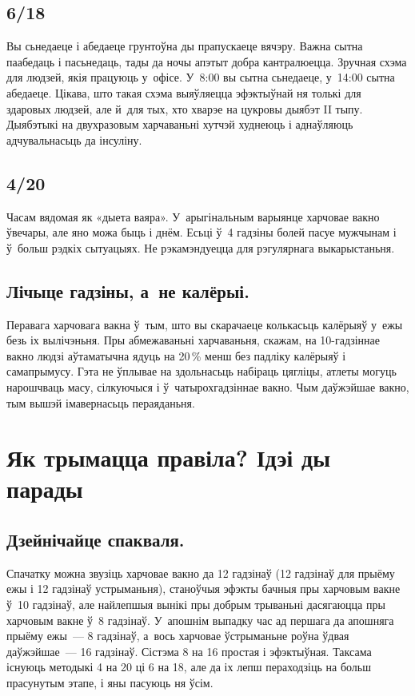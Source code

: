 
\subsection{6/18}
Вы сьнедаеце і абедаеце грунтоўна ды прапускаеце вячэру. Важна сытна паабедаць і пасьнедаць, тады да ночы апэтыт добра кантралюецца. Зручная схэма для людзей, якія працуюць у~офісе. У~8:00 вы сытна сьнедаеце, у~14:00 сытна абедаеце. Цікава, што такая схэма выяўляецца эфэктыўнай ня толькі для здаровых людзей, але й~для тых, хто хварэе на цукровы дыябэт II тыпу. Дыябэтыкі на двухразовым харчаваньні хутчэй худнеюць і аднаўляюць адчувальнасьць да інсуліну.

\subsection{4/20}
Часам вядомая як «дыета ваяра». У~арыгінальным варыянце харчовае вакно ўвечары, але яно можа быць і днём. Есьці ў~4 гадзіны болей пасуе мужчынам і ў~больш рэдкіх сытуацыях. Не рэкамэндуецца для рэгулярнага выкарыстаньня.

\subsection{Лічыце гадзіны, а~не калёрыі.}
Перавага харчовага вакна ў~тым, што вы скарачаеце колькасьць калёрыяў у~ежы безь іх вылічэньня. Пры абмежаваньні харчаваньня, скажам, на 10-гадзіннае вакно людзі аўтаматычна ядуць на 20\,\% менш без падліку калёрыяў і самапрымусу. Гэта не ўплывае на здольнасьць набіраць цягліцы, атлеты могуць нарошчваць масу, сілкуючыся і ў~чатырохгадзіннае вакно. Чым даўжэйшае вакно, тым вышэй імавернасьць пераяданьня.

\section{Як трымацца правіла? Ідэі ды парады}

\subsection{Дзейнічайце спакваля.}
Спачатку можна звузіць харчовае вакно да 12 гадзінаў (12 гадзінаў для прыёму ежы і 12 гадзінаў устрыманьня), станоўчыя эфэкты бачныя пры харчовым вакне ў~10 гадзінаў, але найлепшыя вынікі пры добрым трываньні дасягаюцца пры харчовым вакне ў~8 гадзінаў. У~апошнім выпадку час ад першага да апошняга прыёму ежы~--- 8 гадзінаў, а~вось харчовае ўстрыманьне роўна ўдвая даўжэйшае~--- 16 гадзінаў. Сістэма 8 на 16 простая і эфэктыўная. Таксама існуюць методыкі 4 на 20 ці 6 на 18, але да іх лепш пераходзіць на больш прасунутым этапе, і яны пасуюць ня ўсім.

